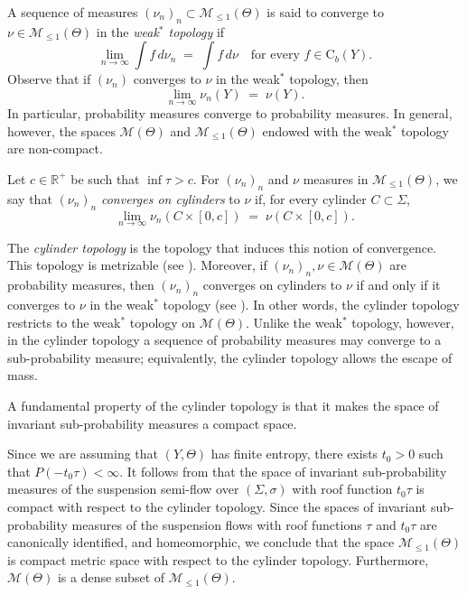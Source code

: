 \documentclass[letterpaper,11pt]{amsart}
\numberwithin{equation}{section}     %
\newcommand{\M}{\mathcal{M}}
\newcommand{\R}{\mathbb{R}}
\def\R{{\mathbb R}}
\def\M{{\mathcal M}}
\def\M{\mathcal{M}}
\begin{document}
A sequence of measures $(\nu_n)_{n} \subset \M_{\leq 1}(\Theta)$ is said to converge to 
$\nu \in \M_{\leq 1}(\Theta)$ in the \emph{weak$^\ast$ topology} if 
\[
\lim_{n \to \infty} \int f \, d\nu_n \;=\; \int f \, d\nu 
\quad \text{for every } f \in \text{C}_b(Y).
\]
Observe that if $(\nu_n)$ converges to $\nu$ in the weak$^\ast$ topology, then 
\[
\lim_{n \to \infty} \nu_n(Y) \;=\; \nu(Y).
\]
In particular, probability measures converge to probability measures. 
In general, however, the spaces $\M(\Theta)$ and $\M_{\leq 1}(\Theta)$ endowed with the weak$^\ast$ topology are non-compact.



Let $c \in \R^+$ be such that $\inf \tau > c$. 
For $(\nu_n)_{n}$ and $\nu$ measures in $\M_{\leq 1}(\Theta)$, 
we say that $(\nu_n)_{n}$ \emph{converges on cylinders} to $\nu$ if, for every cylinder $C \subset \Sigma$, 
\[
\lim_{n \to \infty} \nu_n(C \times [0,c]) \;=\; \nu(C \times [0,c]).
\]

The \emph{cylinder topology} is the topology that induces this notion of convergence. 
This topology is metrizable (see \cite[Lemma~6.6]{iv}). 
Moreover, if $(\nu_n)_{n}, \nu \in \M(\Theta)$ are probability measures, 
then $(\nu_n)_{n}$ converges on cylinders to $\nu$ if and only if it converges to $\nu$ in the weak$^\ast$ topology 
(see \cite[Lemma~6.7]{iv}). 
In other words, the cylinder topology restricts to the weak$^\ast$ topology on $\M(\Theta)$. 
Unlike the weak$^\ast$ topology, however, in the cylinder topology a sequence of probability measures may converge to 
a sub-probability measure; equivalently, the cylinder topology allows the escape of mass. 



A fundamental property of the cylinder topology is that it makes the space of invariant sub-probability measures a compact space. 


\begin{remark} \label{thm_compacidad}

Since we are assuming that $(Y,\Theta)$ has finite entropy, there exists $t_0>0$ such that $P(-t_0\tau)<\infty$. It follows from \cite[Theorem 1.6]{v} that the space of invariant sub-probability measures of the suspension semi-flow over $(\Sigma,\sigma)$ with roof function $t_0\tau$ is compact with respect to the cylinder topology. Since the spaces of invariant sub-probability measures of the suspension flows with roof functions $\tau$ and $t_0\tau$ are canonically identified, and homeomorphic, we conclude that the space $\mathcal{M}_{\leq 1}(\Theta)$ is compact metric space with respect to the cylinder topology. Furthermore,  $\mathcal{M}(\Theta)$ is a dense subset of $\mathcal{M}_{\leq 1}(\Theta)$.
\end{remark}
\end{document}
